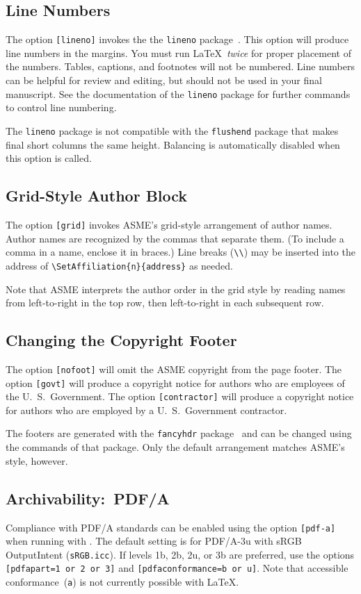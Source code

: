 \documentclass[grid,balance,upint,subscriptcorrection,varvw,mathalfa=cal=euler,spanish,french,greek,russian,vietnamese,colorlinks]{asmeconf}
\begin{document}
\subsection{Line Numbers} The option \texttt{[lineno]} invokes the the \texttt{lineno} package~\cite{bottcher}. This option will produce line numbers in the margins. You must run \LaTeX\ \textit{twice} for proper placement of the numbers. Tables, captions, and footnotes will not be numbered.  Line numbers can be helpful for review and editing, but should not be used in your final manuscript. See the documentation of the \texttt{lineno} package for further commands to control line numbering. 

The \texttt{lineno} package is not compatible with the \texttt{flushend} package that makes final short columns the same height. Balancing is automatically disabled when this option is called. 

\subsection{Grid-Style Author Block} The option \texttt{[grid]} invokes ASME's grid-style arrangement of author names. Author names are recognized by the commas that separate them. (To include a comma in a name, enclose it in braces.) Line breaks (\verb|\\|) may be inserted into the address of \verb|\SetAffiliation{n}{address}| as needed. 

Note that ASME interprets the author order in the grid style by reading names from left-to-right in the top row, then left-to-right in each subsequent row.

\subsection{Changing the Copyright Footer} The option \texttt{[nofoot]} will omit the ASME copyright from the page footer. The option \texttt{[govt]} will produce a copyright notice for authors who are employees of the U.\ S.\ Government.  The option \texttt{[contractor]} will produce a copyright
notice for authors who are employed by a U.\ S.\ Government contractor.

The footers are generated with the \texttt{fancyhdr} package~\cite{oostrum} and can be changed using the commands of that package. Only the default arrangement matches ASME's style, however.

\subsection{Archivability:~PDF/A} Compliance with PDF/A standards can be enabled using the option \texttt{[pdf-a]} 
when running with . The default setting is for PDF/A-3u with sRGB OutputIntent (\texttt{sRGB.icc}). 
If levels 1b, 2b, 2u, or 3b are preferred, use the options \texttt{[pdfapart=1 or 2 or 3]} and 
\texttt{[pdfaconformance=b or u]}. Note that accessible conformance~(\texttt{a}) is not currently possible with \LaTeX.
\end{document}
